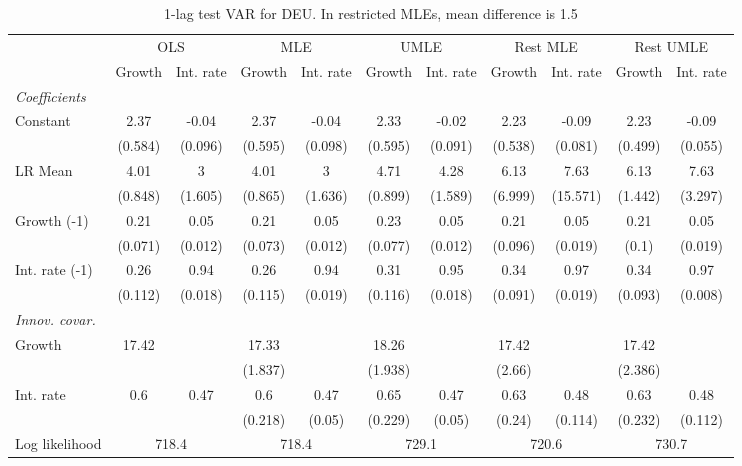 \begin{table}[htbp] 
	\centering
	\begin{tabular}{@{\extracolsep{4pt}}lcccccccccc@{}}		\hline\hline
		 		 & \multicolumn{2}{c}{OLS} &\multicolumn{2}{c}{MLE} &\multicolumn{2}{c}{UMLE} &\multicolumn{2}{c}{Rest MLE} &\multicolumn{2}{c}{Rest UMLE} \\ 
 		 & Growth 	 & Int. rate 	 & Growth 	 & Int. rate 	 & Growth 	 & Int. rate 	 & Growth 	 & Int. rate 	 & Growth 	 & Int. rate\\\cline{2-3}\cline{4-5}\cline{6-7}\cline{8-9}\cline{10-11}
\rule{0pt}{4ex} 
 \emph{Coefficients} 	  		 & 		 & 		 & 		 & 		 & 		 & 		 & 		 & 		 & 		 &\\ 
\quad Constant 	 & 2.37 	 & -0.04 	 & 2.37 	 & -0.04 	 & 2.33 	 & -0.02 	 & 2.23 	 & -0.09 	 & 2.23 	 & -0.09	 \\ 
 		 & (0.584) 	 & (0.096) 	 & (0.595) 	 & (0.098) 	 & (0.595) 	 & (0.091) 	 & (0.538) 	 & (0.081) 	 & (0.499) 	 & (0.055) 	 \\ 
\quad LR Mean 	 & 4.01 	 & 3 	 & 4.01 	 & 3 	 & 4.71 	 & 4.28 	 & 6.13 	 & 7.63 	 & 6.13 	 & 7.63	 \\ 
 		 & (0.848) 	 & (1.605) 	 & (0.865) 	 & (1.636) 	 & (0.899) 	 & (1.589) 	 & (6.999) 	 & (15.571) 	 & (1.442) 	 & (3.297) 	 \\ 
\quad Growth (-1) 	 &0.21 	 & 0.05 	 & 0.21 	 & 0.05 	 & 0.23 	 & 0.05 	 & 0.21 	 & 0.05 	 & 0.21 	 & 0.05	 \\ 
 		 & (0.071) 	 & (0.012) 	 & (0.073) 	 & (0.012) 	 & (0.077) 	 & (0.012) 	 & (0.096) 	 & (0.019) 	 & (0.1) 	 & (0.019) 	 \\ 
\quad Int. rate (-1) 	 &0.26 	 & 0.94 	 & 0.26 	 & 0.94 	 & 0.31 	 & 0.95 	 & 0.34 	 & 0.97 	 & 0.34 	 & 0.97	 \\ 
 		 & (0.112) 	 & (0.018) 	 & (0.115) 	 & (0.019) 	 & (0.116) 	 & (0.018) 	 & (0.091) 	 & (0.019) 	 & (0.093) 	 & (0.008) 	 \\ 
\rule{0pt}{4ex} \emph{Innov. covar.}  	 & 	 & 	 & 	 & 	 & 	 & 	 & 	 & 	 & 	 &\\ 
\quad Growth 	 &17.42 	 &  	 & 17.33 	 &  	 & 18.26 	 &  	 & 17.42 	 &  	 & 17.42 	 & 	 \\ 
 		 &  	 &  	 & (1.837) 	 &  	 & (1.938) 	 &  	 & (2.66) 	 &  	 & (2.386) 	 &  	 \\ 
\quad Int. rate 	 &0.6 	 & 0.47 	 & 0.6 	 & 0.47 	 & 0.65 	 & 0.47 	 & 0.63 	 & 0.48 	 & 0.63 	 & 0.48	 \\ 
 		 &  	 &  	 & (0.218) 	 & (0.05) 	 & (0.229) 	 & (0.05) 	 & (0.24) 	 & (0.114) 	 & (0.232) 	 & (0.112) 	 \\ 
 \hline \rule{0pt}{4ex} 
  Log likelihood 	 &\multicolumn{2}{c}{718.4} 	 & \multicolumn{2}{c}{718.4} 	 & \multicolumn{2}{c}{729.1} 	 & \multicolumn{2}{c}{720.6} 	 & \multicolumn{2}{c}{730.7}\\ 

 \hline 	\end{tabular}		\caption{1-lag test VAR for DEU. In restricted MLEs, mean difference is 1.5}
		\label{tab:DEU1lag}

\end{table}